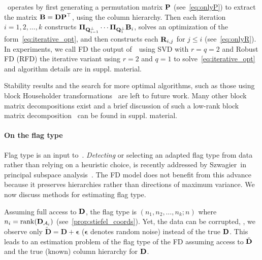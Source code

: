 \algname~operates by first generating a permutation matrix $\mathbf{P}$ (see~\cref{eq:onlyP}) to extract the matrix $\mathbf{B} = \mathbf{D}\mathbf{P}^\top$, using the column hierarchy. Then each iteration $i=1,2,\dots,k$ constructs $\boldsymbol{\Pi}_{\mathbf{Q}_{i-1}^\perp}\cdots \boldsymbol{\Pi}_{\mathbf{Q}_1^\perp} \mathbf{B}_i$, solves an optimization of the form~\cref{eq:iterative_opt}, and then constructs each $\mathbf{R}_{i,j}$ for $j \leq i$ (see~\cref{eq:onlyR}). In experiments, we call FD the output of~\algname~using SVD with $r=q=2$ and Robust FD (RFD) the iterative variant using $r=2$ and $q=1$ to solve~\cref{eq:iterative_opt} and algorithm details are in suppl. material.



Stability results and the search for more optimal algorithms, such as those using block Householder transformations~\cite{griem2024block} are left to future work. Many other block matrix decompositions exist and a brief discussion of such a low-rank block matrix decomposition~\cite{ong2016beyond} can be found in suppl. material.







 

\paragraph{On the flag type}
Flag type is an input to~\algname. \emph{Detecting} or selecting an adapted flag type from data rather than relying on a heuristic choice, is recently addressed by Szwagier~\etal in principal subspace analysis~\cite{szwagier2024curseisotropyprincipalcomponents}. 
The FD model does not benefit from this advance because it preserves hierarchies rather than directions of maximum variance. We now discuss methods for estimating flag type.


Assuming full access to $\mathbf{D}$, the flag type is $(n_1,n_2,\dots,n_k;n)$ where $n_i = \mathrm{rank}(\mathbf{D}_{\mathcal{A}_i})$ (see~\cref{prop:stiefel_coords}). 
Yet, the data can be corrupted, \ie, we observe only $\tilde{\mathbf{D}} = \mathbf{D} + \bm{\epsilon}$ ($ \bm{\epsilon} $ denotes random noise) instead of the true $\mathbf{D}$. This leads to an estimation problem of the flag type of the FD assuming access to $\tilde{\mathbf{D}}$ and the true (known) column hierarchy for $\mathbf{D}$.     

